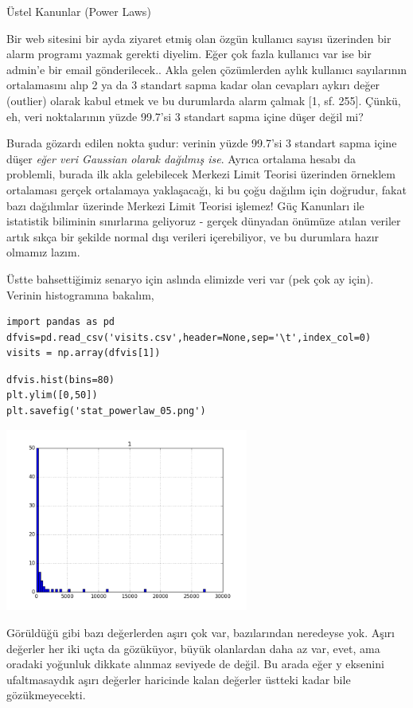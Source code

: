 \documentclass[12pt,fleqn]{article}\usepackage{../../common}
\begin{document}
Üstel Kanunlar (Power Laws)

Bir web sitesini bir ayda ziyaret etmiş olan özgün kullanıcı sayısı
üzerinden bir alarm programı yazmak gerekti diyelim. Eğer çok fazla
kullanıcı var ise bir admin'e bir email gönderilecek.. Akla gelen
çözümlerden aylık kullanıcı sayılarının ortalamasını alıp 2 ya da 3
standart sapma kadar olan cevapları aykırı değer (outlier) olarak kabul
etmek ve bu durumlarda alarm çalmak [1, sf. 255]. Çünkü, eh, veri
noktalarının yüzde 99.7'si 3 standart sapma içine düşer değil mi?

Burada gözardı edilen nokta şudur: verinin yüzde 99.7'si 3 standart sapma
içine düşer {\em eğer veri Gaussian olarak dağılmış ise}. Ayrıca ortalama
hesabı da problemli, burada ilk akla gelebilecek Merkezi Limit Teorisi
üzerinden örneklem ortalaması gerçek ortalamaya yaklaşacağı, ki bu çoğu
dağılım için doğrudur, fakat bazı dağılımlar üzerinde Merkezi Limit Teorisi
işlemez! Güç Kanunları ile istatistik biliminin sınırlarına geliyoruz -
gerçek dünyadan önümüze atılan veriler artık sıkça bir şekilde normal dışı
verileri içerebiliyor, ve bu durumlara hazır olmamız lazım.

Üstte bahsettiğimiz senaryo için aslında elimizde veri var (pek çok ay
için). Verinin histogramına bakalım,

\begin{verbatim}
import pandas as pd
dfvis=pd.read_csv('visits.csv',header=None,sep='\t',index_col=0)
visits = np.array(dfvis[1])
\end{verbatim}

\begin{verbatim}
dfvis.hist(bins=80)
plt.ylim([0,50])
plt.savefig('stat_powerlaw_05.png')
\end{verbatim}

\includegraphics[height=6cm]{stat_powerlaw_05.png}

Görüldüğü gibi bazı değerlerden aşırı çok var, bazılarından neredeyse yok.
Aşırı değerler her iki uçta da gözüküyor, büyük olanlardan daha az var,
evet, ama oradaki yoğunluk dikkate alınmaz seviyede de değil. Bu arada eğer
y eksenini ufaltmasaydık aşırı değerler haricinde kalan değerler üstteki
kadar bile gözükmeyecekti.
\end{document}
